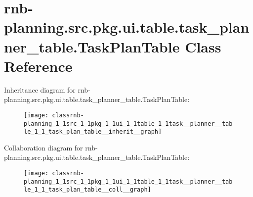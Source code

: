 \hypertarget{classrnb-planning_1_1src_1_1pkg_1_1ui_1_1table_1_1task__planner__table_1_1_task_plan_table}{}\section{rnb-\/planning.src.\+pkg.\+ui.\+table.\+task\+\_\+planner\+\_\+table.\+Task\+Plan\+Table Class Reference}
\label{classrnb-planning_1_1src_1_1pkg_1_1ui_1_1table_1_1task__planner__table_1_1_task_plan_table}


Inheritance diagram for rnb-\/planning.src.\+pkg.\+ui.\+table.\+task\+\_\+planner\+\_\+table.\+Task\+Plan\+Table\+:\nopagebreak
\begin{figure}[H]
\begin{center}
\leavevmode
\texttt{[image: classrnb-planning\_1\_1src\_1\_1pkg\_1\_1ui\_1\_1table\_1\_1task\_\_planner\_\_table\_1\_1\_task\_plan\_table\_\_inherit\_\_graph]}
\end{center}
\end{figure}


Collaboration diagram for rnb-\/planning.src.\+pkg.\+ui.\+table.\+task\+\_\+planner\+\_\+table.\+Task\+Plan\+Table\+:\nopagebreak
\begin{figure}[H]
\begin{center}
\leavevmode
\texttt{[image: classrnb-planning\_1\_1src\_1\_1pkg\_1\_1ui\_1\_1table\_1\_1task\_\_planner\_\_table\_1\_1\_task\_plan\_table\_\_coll\_\_graph]}
\end{center}
\end{figure}

